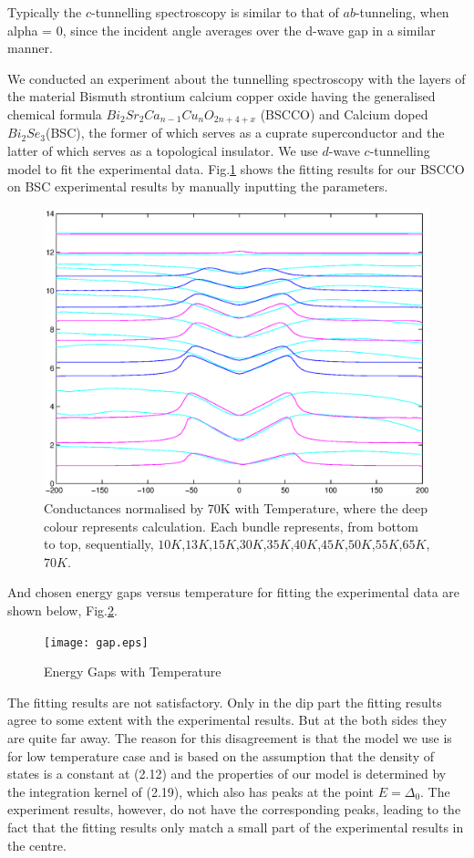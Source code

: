 Typically the $c$-tunnelling spectroscopy is similar to that of $ab$-tunneling, when alpha = 0, since the incident angle averages over the d-wave gap in a similar manner. 

We conducted an experiment about the tunnelling spectroscopy with the layers of the material Bismuth strontium calcium copper oxide having the generalised chemical formula $Bi_2Sr_2Ca_{n-1}Cu_nO_{2n+4+x}$ (BSCCO) and Calcium doped $Bi_2Se_3$(BSC), the former of which serves as a cuprate superconductor \citep{BSCCO} and the latter of which serves as a topological insulator\citep{Semiconductor}. We use $d$-wave $c$-tunnelling model to fit the experimental data.
Fig.\ref{fig:fitting} shows the fitting results for our BSCCO on BSC experimental results by manually inputting the parameters.
 \begin{figure}[htbp]
\small
\centering
\includegraphics[width=12cm]{./Figures/Fitting.eps}
\caption{Conductances normalised by 70K with Temperature, where the deep colour represents calculation. Each bundle represents, from bottom to top, sequentially,  $10K$,$13K$,$15K$,$30K$,$35K$,$40K$,$45K$,$50K$,$55K$,$65K$,$70K$.}
\label{fig:fitting}
\end{figure}

And chosen energy gaps versus temperature for fitting the experimental data are shown below, Fig.\ref{fig:fit pair potential}.
 \begin{figure}[htbp]
\small
\centering
\texttt{[image: gap.eps]}
\caption{Energy Gaps with Temperature}
\label{fig:fit pair potential}
\end{figure}


The fitting results are not satisfactory. Only in the dip part the fitting results agree to some extent with the experimental results. But at the both sides they are quite far away. The reason for this disagreement is that the model we use is for low temperature case and is based on the assumption that the density of states is a constant at (2.12) and the properties of our model is determined by the integration kernel of (2.19), which also has peaks at the point $E=\Delta_0$. The experiment results, however, do not have the corresponding peaks, leading to the fact that the fitting results only match a small part of the experimental results in the centre.

